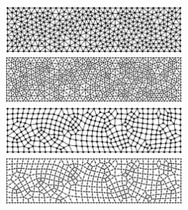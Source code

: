 \begin{figure}[H]
\centering
\begin{subcaptiongroup}
\parbox[b]{0.6\textwidth}{
    \includegraphics[width=0.6\textwidth]{png/cantilever_tri3_irregular_385.png}
    \caption{}
}
\parbox[b]{0.6\textwidth}{
    \includegraphics[width=0.6\textwidth]{png/cantilever_tri6_irregular_1457.png}
    \caption{}
}
\parbox[b]{0.6\textwidth}{
    \includegraphics[width=0.6\textwidth]{png/cantilever_quad4_irregular_367.png}
    \caption{}
}
\parbox[b]{0.6\textwidth}{
    \includegraphics[width=0.6\textwidth]{png/cantilever_quad8_irregular_1059.png}
    \caption{}
}
\end{subcaptiongroup}
\caption{}\label{fg:cantilever_irregular_mesh}
\end{figure}

